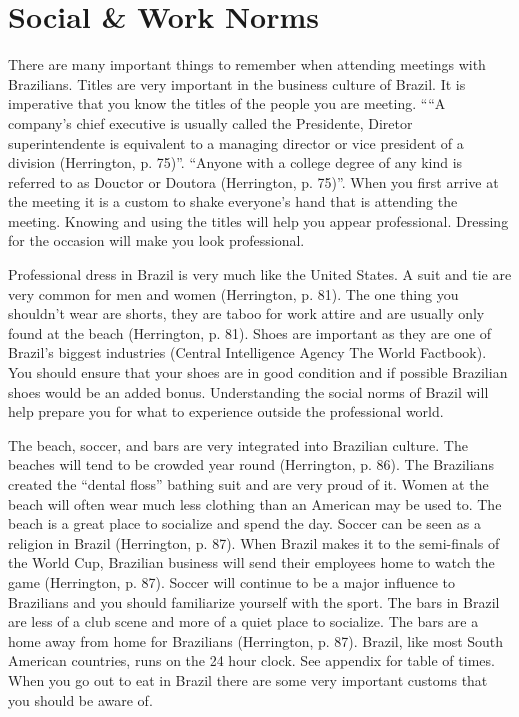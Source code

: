 \documentclass[11pt,a4paper,twoside]{report}
\begin{document}
\section{Social \& Work Norms}

There are many important things to remember when attending meetings with
Brazilians. Titles are very important in the business culture of Brazil. It
is imperative that you know the titles of the people you are meeting. ““A
company’s chief executive is usually called the Presidente, Diretor
superintendente is equivalent to a managing director or vice president of a
division (Herrington, p. 75)”.  “Anyone with a college degree of any kind
is referred to as Douctor or Doutora (Herrington, p. 75)”. When you first
arrive at the meeting it is a custom to shake everyone’s hand that is
attending the meeting. Knowing and using the titles will help you appear
professional. Dressing for the occasion will make you look professional.

Professional dress in Brazil is very much like the United States. A suit and
tie are very common for men and women (Herrington, p. 81). The one thing you
shouldn’t wear are shorts, they are taboo for work attire and are usually only
found at the beach (Herrington, p. 81). Shoes are important as they are one of
Brazil’s biggest industries (Central Intelligence Agency The World Factbook).
You should ensure that your shoes are in good condition and if possible
Brazilian shoes would be an added bonus. Understanding the social norms of
Brazil will help prepare you for what to experience outside the professional
world.

The beach, soccer, and bars are very integrated into Brazilian culture. The
beaches will tend to be crowded year round (Herrington, p. 86). The Brazilians
created the “dental floss” bathing suit and are very proud of it. Women at the
beach will often wear much less clothing than an American may be used to. The
beach is a great place to socialize and spend the day.  Soccer can be seen as a
religion in Brazil (Herrington, p. 87). When Brazil makes it to the semi-finals
of the World Cup, Brazilian business will send their employees home to watch
the game (Herrington, p. 87). Soccer will continue to be a major influence to
Brazilians and you should familiarize yourself with the sport. The bars in
Brazil are less of a club scene and more of a quiet place to socialize. The
bars are a home away from home for Brazilians (Herrington, p. 87). Brazil, like
most South American countries, runs on the 24 hour clock. See appendix for
table of times.  When you go out to eat in Brazil there are some very important
customs that you should be aware of.
\end{document}
